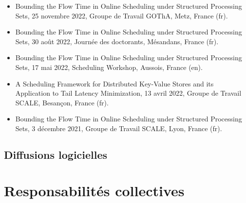 \documentclass[12pt]{article}
\newcommand{\cvitem}[2]{\item[#1] #2}
\newcounter{cvitems}
\begin{document}
\begin{itemize}
  \item \foreignlanguage{english}{Bounding the Flow Time in Online Scheduling under Structured
  Processing Sets}, 25 novembre 2022, Groupe de Travail GOThA, Metz, France (fr).
  \item \foreignlanguage{english}{Bounding the Flow Time in Online Scheduling under Structured
  Processing Sets}, 30 août 2022, Journée des doctorants, Mésandans, France (fr).
  \item \foreignlanguage{english}{Bounding the Flow Time in Online Scheduling under Structured
  Processing Sets}, 17 mai 2022, Scheduling Workshop, Aussois, France (en).
  \item \foreignlanguage{english}{A Scheduling Framework for Distributed Key-Value Stores and its
  Application to Tail Latency Minimization}, 13 avril 2022, Groupe de Travail SCALE, Besançon,
  France (fr).
  \item \foreignlanguage{english}{Bounding the Flow Time in Online Scheduling under Structured
  Processing Sets}, 3 décembre 2021, Groupe de Travail SCALE, Lyon, France (fr).
\end{itemize}

\subsection{Diffusions logicielles}

\section{Responsabilités collectives}





\end{document}
